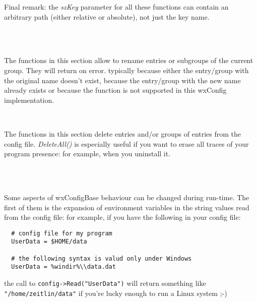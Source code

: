 Final remark: the {\it szKey} parameter for all these functions can contain an
arbitrary path (either relative or absolute), not just the key name.

\\
\\


\label{configrenaming}

The functions in this section allow to rename entries or subgroups of the
current group. They will return \false on error. typically because either the
entry/group with the original name doesn't exist, because the entry/group with
the new name already exists or because the function is not supported in this
wxConfig implementation.

\\


\label{configdeleting}

The functions in this section delete entries and/or groups of entries from the
config file. {\it DeleteAll()} is especially useful if you want to erase all
traces of your program presence: for example, when you uninstall it.

\\
\\


\label{configoptions}

Some aspects of wxConfigBase behaviour can be changed during run-time. The
first of them is the expansion of environment variables in the string values
read from the config file: for example, if you have the following in your
config file:

\begin{verbatim}
  # config file for my program
  UserData = $HOME/data

  # the following syntax is valud only under Windows
  UserData = %windir%\\data.dat
\end{verbatim}
the call to {\tt config->Read("UserData")} will return something like
{\tt "/home/zeitlin/data"} if you're lucky enough to run a Linux system ;-)

